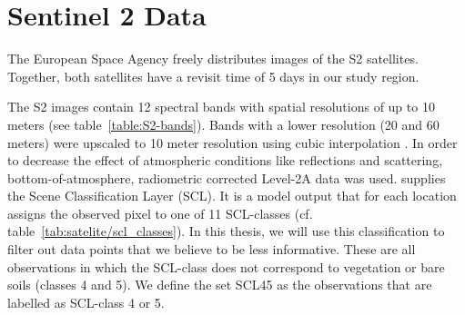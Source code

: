 \section{Sentinel 2 Data}{
	\label{sec:s2_img_data}
		The European Space Agency \citep{esaSentinel22022} freely distributes images of the S2 satellites. Together, both satellites have a revisit time of 5 days in our study region.
		
		
		
		The S2 images contain 12 spectral bands with spatial resolutions of up to 10 meters (see table~\ref{table:S2-bands}). Bands with a lower resolution (20 and 60 meters) were upscaled to 10 meter resolution using cubic interpolation \citep{perichPixelbasedCropYield2022}. In order to decrease the effect of atmospheric conditions like reflections and scattering, bottom-of-atmosphere, radiometric corrected Level-2A data was used. %
		\cite{esaLevel2AAlgorithmOverview2022} supplies the Scene Classification Layer ({SCL}). It is a model output that for each location assigns the observed pixel to one of 11 SCL-classes (cf. table~\ref{tab:satelite/scl_classes}). 
		In this thesis, we will use this classification to filter out data points that we believe to be less informative. These are all observations in which the SCL-class does not correspond to vegetation or bare soils (classes 4 and 5). We define the set SCL45 as the observations that are labelled as SCL-class 4 or 5.
		

		
		

	
}

